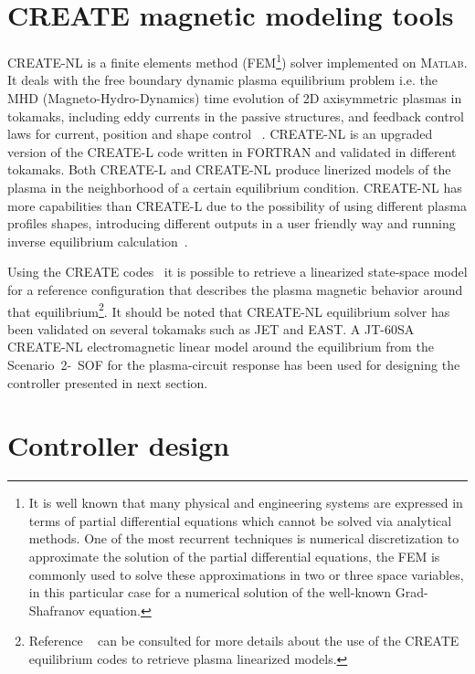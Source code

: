 \section{CREATE magnetic modeling tools}

CREATE-NL  is a finite elements method (FEM\footnote{It is well known that many physical and engineering systems are expressed in terms of partial differential equations which cannot be solved via analytical methods. One of the most recurrent techniques is numerical discretization to approximate the solution of the partial differential equations, the FEM is commonly used to solve these approximations in two or three space variables, in this particular case for a numerical solution of the well-known Grad-Shafranov equation. }) solver implemented on \textsc{Matlab}. It deals with the free boundary dynamic plasma equilibrium problem i.e. the MHD (Magneto-Hydro-Dynamics) time evolution of 2D axisymmetric plasmas in tokamaks, including eddy currents in the passive structures, and feedback control laws for current, position and shape control ~\cite{Albanese:CREATENLnew}. CREATE-NL is an upgraded version of the CREATE-L code written in FORTRAN and validated in different tokamaks. Both CREATE-L and CREATE-NL produce linerized models of the plasma in the neighborhood of a certain equilibrium condition. CREATE-NL has more capabilities than CREATE-L due to the possibility of using different plasma profiles shapes,  introducing different outputs in a user friendly way and  running inverse equilibrium calculation~\cite{DeTommasi2007}. 
\smallskip

Using the CREATE codes~\cite{Albanese:CREATEL,Albanese:CREATENLnew} it is possible to retrieve a linearized state-space model for a reference configuration that describes the plasma magnetic behavior around that equilibrium\footnote{Reference  ~\cite[Sec.~3]{NCruz} can be consulted for more details about the use of the CREATE equilibrium codes to retrieve plasma linearized models.}. It should be noted that CREATE-NL equilibrium solver has been validated on several tokamaks such as JET and EAST. A JT-60SA CREATE-NL electromagnetic linear model around the equilibrium from the Scenario~2-~SOF  for the plasma-circuit response has been used for  designing  the controller presented in next section. 
\smallskip






\section{Controller design}

